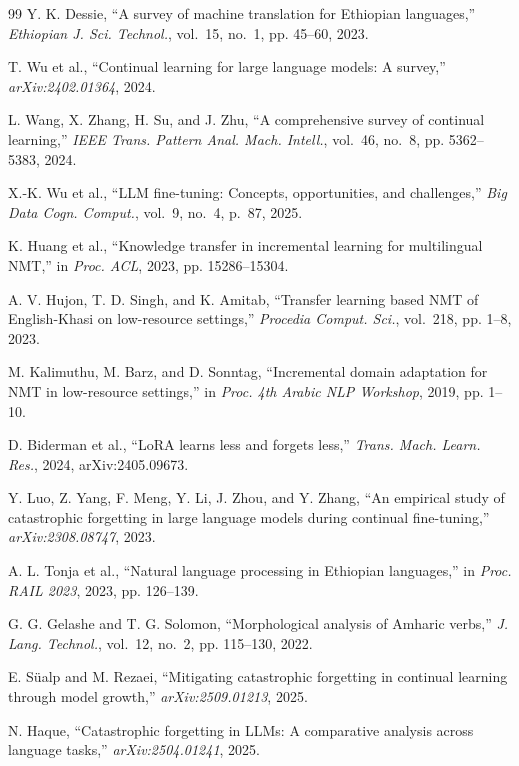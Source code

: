 \documentclass[11pt,a4paper]{article}
\begin{document}
\begin{thebibliography}{99}
Y. K. Dessie, ``A survey of machine translation for Ethiopian
languages,'' \emph{Ethiopian J. Sci. Technol.}, vol.~15, no.~1,
pp. 45--60, 2023.

T. Wu et al., ``Continual learning for large language models: A
survey,'' \emph{arXiv:2402.01364}, 2024.

L. Wang, X. Zhang, H. Su, and J. Zhu, ``A comprehensive survey of
continual learning,'' \emph{IEEE Trans. Pattern Anal. Mach. Intell.},
vol.~46, no.~8, pp. 5362--5383, 2024.

X.-K. Wu et al., ``LLM fine-tuning: Concepts, opportunities, and
challenges,'' \emph{Big Data Cogn. Comput.}, vol.~9, no.~4, p.~87, 2025.

K. Huang et al., ``Knowledge transfer in incremental learning for
multilingual NMT,'' in \emph{Proc. ACL}, 2023, pp. 15286--15304.

A. V. Hujon, T. D. Singh, and K. Amitab, ``Transfer learning based
NMT of English-Khasi on low-resource settings,'' \emph{Procedia
Comput. Sci.}, vol.~218, pp. 1--8, 2023.

M. Kalimuthu, M. Barz, and D. Sonntag, ``Incremental domain
adaptation for NMT in low-resource settings,'' in \emph{Proc. 4th
Arabic NLP Workshop}, 2019, pp. 1--10.

D. Biderman et al., ``LoRA learns less and forgets less,'' \emph{Trans.
Mach. Learn. Res.}, 2024, arXiv:2405.09673.

Y. Luo, Z. Yang, F. Meng, Y. Li, J. Zhou, and Y. Zhang, ``An empirical
study of catastrophic forgetting in large language models during
continual fine-tuning,'' \emph{arXiv:2308.08747}, 2023.

A. L. Tonja et al., ``Natural language processing in Ethiopian
languages,'' in \emph{Proc. RAIL 2023}, 2023, pp. 126--139.

G. G. Gelashe and T. G. Solomon, ``Morphological analysis of Amharic
verbs,'' \emph{J. Lang. Technol.}, vol.~12, no.~2, pp. 115--130, 2022.

E. S\"ualp and M. Rezaei, ``Mitigating catastrophic forgetting in
continual learning through model growth,'' \emph{arXiv:2509.01213},
2025.

N. Haque, ``Catastrophic forgetting in LLMs: A comparative analysis
across language tasks,'' \emph{arXiv:2504.01241}, 2025.


\end{thebibliography}
\end{document}
